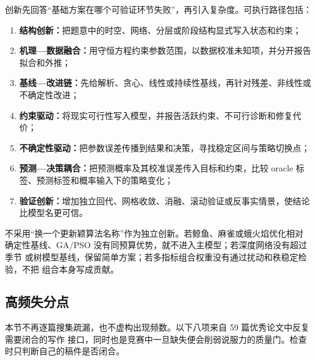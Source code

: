 \documentclass[UTF8,a4paper,12pt]{ctexart}
\begin{document}
创新先回答“基础方案在哪个可验证环节失败”，再引入复杂度。可执行路径包括：
\begin{enumerate}
  \item \textbf{结构创新：}把题意中的时空、网络、分层或阶段结构显式写入状态和约束；
  \item \textbf{机理—数据融合：}用守恒方程约束参数范围，以数据校准未知项，并分开报告拟合和外推；
  \item \textbf{基线—改进链：}先给解析、贪心、线性或持续性基线，再针对残差、非线性或不确定性改进；
  \item \textbf{约束驱动：}将现实可行性写入模型，并报告活跃约束、不可行诊断和修复代价；
  \item \textbf{不确定性驱动：}把参数误差传播到结果和决策，寻找稳定区间与策略切换点；
  \item \textbf{预测—决策耦合：}把预测概率及其校准误差传入目标和约束，比较 oracle 标签、预测标签和概率输入下的策略变化；
  \item \textbf{验证创新：}增加独立回代、网格收敛、消融、滚动验证或反事实情景，使结论比模型名更可信。
\end{enumerate}

不采用“换一个更新颖算法名称”作为独立创新。若鲸鱼、麻雀或蛾火焰优化相对
确定性基线、GA/PSO 没有同预算优势，就不进入主模型；若深度网络没有超过季节
或树模型基线，保留简单方案；若多指标组合权重没有通过扰动和秩稳定检验，不把
组合本身写成贡献。
\subsection{高频失分点}

本节不再逐篇搜集疏漏，也不虚构出现频数。以下八项来自 59 篇优秀论文中反复需要闭合的写作
接口，同时也是竞赛中一旦缺失便会削弱说服力的质量门。检查时只判断自己的稿件是否闭合。
\end{document}
